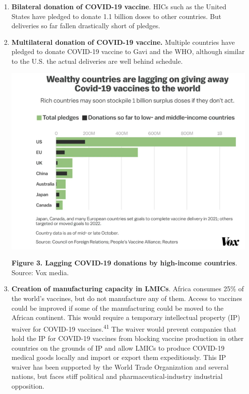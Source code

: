 \documentclass[
  11pt,
  paper=a4,
  ,captions=tableheading
]{scrartcl}
\begin{document}
\begin{enumerate}
\def\labelenumi{\arabic{enumi}.}
\item
  \textbf{Bilateral donation of COVID-19 vaccine}. HICs such as the
  United States have pledged to donate 1.1 billion doses to other
  countries. But deliveries so far fallen drastically short of pledges.
\item
  \textbf{Multilateral donation of COVID-19 vaccine.} Multiple countries
  have pledged to donate COVID-19 vaccine to Gavi and the WHO, although
  similar to the U.S. the actual deliveries are well behind schedule.

  \includegraphics[width=5.20833in,height=\textheight]{images/lagging donation_VOX.png}

  \textbf{Figure 3. Lagging COVID-19 donations by high-income
  countries}. Source: Vox media.
\item
  \textbf{Creation of manufacturing capacity in LMICs}. Africa consumes
  25\% of the world's vaccines, but do not manufacture any of them.
  Access to vaccines could be improved if some of the manufacturing
  could be moved to the African continent. This would require a
  temporary intellectual property (IP) waiver for COVID-19
  vaccines.\textsuperscript{41} The waiver would prevent companies that
  hold the IP for COVID-19 vaccines from blocking vaccine production in
  other countries on the grounds of IP and allow LMICs to produce
  COVID-19 medical goods locally and import or export them
  expeditiously. This IP waiver has been supported by the World Trade
  Organization and several nations, but faces stiff political and
  pharmaceutical-industry industrial opposition.
\end{enumerate}
\end{document}
